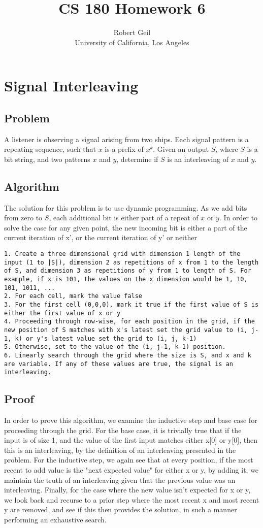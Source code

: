 \documentclass[titlepage]{article}
\title{CS 180 Homework 6}
\author{Robert Geil \\
University of California, Los Angeles
}
\begin{document}
\maketitle

\section{Signal Interleaving}
\subsection{Problem}
A listener is observing a signal arising from two ships. Each signal pattern is a repeating sequence, such that $x$ is a prefix of $x^k$.
Given an output $S$, where $S$ is a bit string, and two patterns $x$ and $y$, determine if $S$ is an interleaving of $x$ and $y$.
\subsection{Algorithm}
The solution for this problem is to use dynamic programming. As we add bits from zero to $S$, each additional bit is either part of a repeat
of $x$ or $y$. In order to solve the case for any given point, the new incoming bit is either a part of the current iteration of x', or the
current iteration of y' or neither
\begin{lstlisting}
1. Create a three dimensional grid with dimension 1 length of the input (1 to |S|), dimension 2 as repetitions of x from 1 to the length of S, and dimension 3 as repetitions of y from 1 to length of S. For example, if x is 101, the values on the x dimension would be 1, 10, 101, 1011, ...
2. For each cell, mark the value false
3. For the first cell (0,0,0), mark it true if the first value of S is either the first value of x or y
4. Proceeding through row-wise, for each position in the grid, if the new position of S matches with x's latest set the grid value to (i, j-1, k) or y's latest value set the grid to (i, j, k-1)
5. Otherwise, set to the value of the (i, j-1, k-1) position.
6. Linearly search through the grid where the size is S, and x and k are variable. If any of these values are true, the signal is an interleaving.
\end{lstlisting}
\subsection{Proof}
In order to prove this algorithm, we examine the inductive step and base case for proceeding through the grid. For the base case, it is
trivially true that if the input is of size 1, and the value of the first input matches either x[0] or y[0], then this is an interleaving, by
the definition of an interleaving presented in the problem. For the inductive step, we again see that at every position, if the most recent to
add value is the "next expected value" for either x or y, by adding it, we maintain the truth of an interleaving given that the previous
value was an interleaving. Finally, for the case where the new value isn't expected for x or y, we look back and recurse to a prior step where
the most recent x and most recent y are removed, and see if this then provides the solution, in such a manner performing an exhaustive search.
\end{document}
